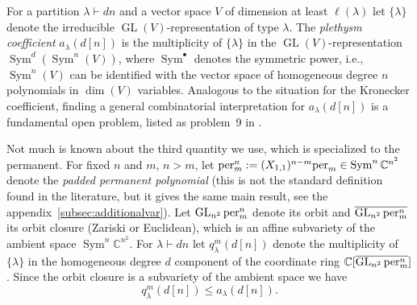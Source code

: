 \documentclass{article}
\numberwithin{equation}{section}
\theoremstyle{definition}
\def\la{\lambda}
\newcommand{\IC}{\mathbb C}
\DeclareMathOperator{\GL}{GL}
\DeclareMathOperator{\Sym}{Sym}
\newcommand{\per}{\textup{per}}
\begin{document}
For a partition $\la \vdash dn$ and a vector space $V$ of dimension at least $\ell(\la)$ let $\{\la\}$
denote the irreducible $\GL(V)$-representation of type $\la$.
The \emph{plethysm coefficient} $a_{\la}(d[n])$ is
the multiplicity of $\{\la\}$ in the $\GL(V)$-representation $\Sym^d(\Sym^n(V))$,
where $\Sym^\bullet$ denotes the symmetric power, i.e.,
$\Sym^n(V)$ can be identified with the vector space of homogeneous degree $n$ polynomials in $\dim(V)$ variables.
Analogous to the situation for the Kronecker coefficient,
finding a general combinatorial interpretation for $a_\la(d[n])$ is a fundamental open problem,
listed as problem~9 in \cite{sta:00}.

Not much is known about the third quantity we use, which is specialized to the permanent.
For fixed $n$ and $m$, $n > m$, let $\per_m^n := (X_{1,1})^{n-m}\per_m \in \Sym^n \IC^{n^2}$ denote the \emph{padded permanent polynomial}
(this is not the standard definition found in the literature, but it gives the same main result, see the appendix~\ref{subsec:additionalvar}).
Let $\GL_{n^2}\per_m^n$ denote its orbit and $\overline{\GL_{n^2}\per_m^n}$
its orbit closure (Zariski or Euclidean), which is an affine subvariety of the ambient space $\Sym^n\IC^{n^2}$.
For $\la \vdash dn$ let
$q^m_\la(d[n])$ denote the multiplicity of $\{\la\}$ in the homogeneous degree $d$
component of the coordinate ring $\IC[\overline{\GL_{n^2}\per_m^n}]$.
Since the orbit closure is a subvariety of the ambient space we have
\begin{equation}\label{eq:omegaa}
q^m_\la(d[n]) \leq a_\la(d[n]).
\end{equation}
\end{document}
